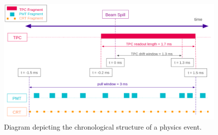 


\begin{figure}[b!] 
\centering    
\includegraphics[width=1.0\textwidth]{SBND_Event_Structure}
\caption[Chronological Structure of a Physics Event Diagram]{
Diagram depicting the chronological structure of a physics event. 
}
\label{fig:SBNDEventStructure}
\end{figure}

